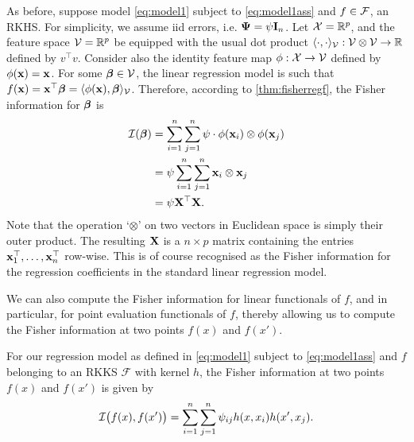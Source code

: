 \begin{example}
  As before, suppose model \cref{eq:model1} subject to \cref{eq:model1ass} and $f\in{\mathcal F}$, an RKHS.
  For simplicity, we assume iid errors, i.e. ${\bm\Psi} = \psi {\mathbf I}_n$.
  Let ${\mathcal X} = \mathbb{R}^p$, and the feature space ${\mathcal V} = \mathbb{R}^p$ be equipped with the usual dot product $\langle\cdot,\cdot\rangle_{\mathcal V}:{\mathcal V} \otimes {\mathcal V} \to \mathbb{R}$ defined by $v^\top v$.
  Consider also the identity feature map $\phi:{\mathcal X} \to {\mathcal V}$ defined by $\phi({\mathbf x})={\mathbf x}$.
  For some $\boldsymbol\beta \in {\mathcal V}$, the linear regression model is such that $f({\mathbf x}) = {\mathbf x}^\top \boldsymbol\beta = \langle\phi({\mathbf x}),\boldsymbol\beta\rangle_{\mathcal V}$.
  Therefore, according to \cref{thm:fisherregf}, the Fisher information for ${\bm\beta}$ is
  \begin{align*}
    {\mathcal I}(\boldsymbol\beta) 
    &= \sum_{i=1}^n\sum_{j=1}^n \psi \cdot \phi({\mathbf x}_i) \otimes \phi({\mathbf x}_j) \\
    &= \psi \sum_{i=1}^n\sum_{j=1}^n {\mathbf x}_i \otimes {\mathbf x}_j \\
    &= \psi {\mathbf X}^\top {\mathbf X}.
  \end{align*}
  Note that the operation `$\otimes$' on two vectors in Euclidean space is simply their outer product.
  The resulting ${\mathbf X}$ is a $n \times p$ matrix containing the entries ${\mathbf x}_1^\top,\dots,{\mathbf x}_n^\top$ row-wise.
  This is of course recognised as the Fisher information for the regression coefficients in the standard linear regression model.
\end{example}

We can also compute the Fisher information for linear functionals of $f$, and in particular, for point evaluation functionals of $f$, thereby allowing us to compute the Fisher information at two points $f(x)$ and $f(x')$.

\begin{corollary}\label{thm:fisherreglinfunc}
	For our regression model as defined in \cref{eq:model1} subject to \cref{eq:model1ass} and $f$ belonging to an RKKS $\mathcal F$ with kernel $h$, the Fisher information at two points $f(x)$ and $f(x')$
	is given by
	\[
		{\mathcal I}\big(f(x),f(x')\big) = \sum_{i=1}^n\sum_{j=1}^n \psi_{ij} h(x,x_i)h(x',x_j).
	\]
\end{corollary}

